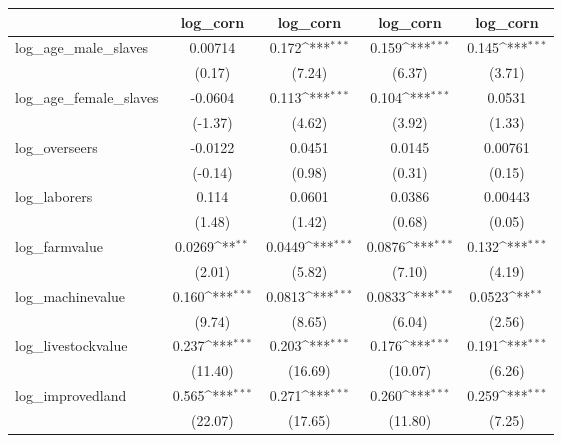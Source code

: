 {
\def\sym#1{\ifmmode^{#1}\else\(^{#1}\)\fi}
\begin{tabular}{l*{4}{c}}
\hline\hline
            &\multicolumn{1}{c}{log\_corn}&\multicolumn{1}{c}{log\_corn}&\multicolumn{1}{c}{log\_corn}&\multicolumn{1}{c}{log\_corn}\\
\hline
log\_age\_male\_slaves&     0.00714         &       0.172\sym{***}&       0.159\sym{***}&       0.145\sym{***}\\
            &      (0.17)         &      (7.24)         &      (6.37)         &      (3.71)         \\
[1em]
log\_age\_female\_slaves&     -0.0604         &       0.113\sym{***}&       0.104\sym{***}&      0.0531         \\
            &     (-1.37)         &      (4.62)         &      (3.92)         &      (1.33)         \\
[1em]
log\_overseers&     -0.0122         &      0.0451         &      0.0145         &     0.00761         \\
            &     (-0.14)         &      (0.98)         &      (0.31)         &      (0.15)         \\
[1em]
log\_laborers&       0.114         &      0.0601         &      0.0386         &     0.00443         \\
            &      (1.48)         &      (1.42)         &      (0.68)         &      (0.05)         \\
[1em]
log\_farmvalue&      0.0269\sym{**} &      0.0449\sym{***}&      0.0876\sym{***}&       0.132\sym{***}\\
            &      (2.01)         &      (5.82)         &      (7.10)         &      (4.19)         \\
[1em]
log\_machinevalue&       0.160\sym{***}&      0.0813\sym{***}&      0.0833\sym{***}&      0.0523\sym{**} \\
            &      (9.74)         &      (8.65)         &      (6.04)         &      (2.56)         \\
[1em]
log\_livestockvalue&       0.237\sym{***}&       0.203\sym{***}&       0.176\sym{***}&       0.191\sym{***}\\
            &     (11.40)         &     (16.69)         &     (10.07)         &      (6.26)         \\
[1em]
log\_improvedland&       0.565\sym{***}&       0.271\sym{***}&       0.260\sym{***}&       0.259\sym{***}\\
            &     (22.07)         &     (17.65)         &     (11.80)         &      (7.25)         \\

\end{tabular}}
